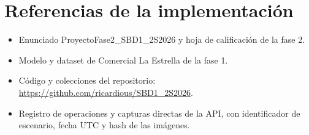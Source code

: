 \documentclass[10pt,letterpaper]{article}
\begin{document}
\section{Referencias de la implementación}

\begin{itemize}\item Enunciado ProyectoFase2\_SBD1\_2S2026 y hoja de calificación de la fase 2.\item Modelo y dataset de Comercial La Estrella de la fase 1.\item Código y colecciones del repositorio: \url{https://github.com/ricardious/SBD1_2S2026}.\item Registro de operaciones y capturas directas de la API, con identificador de escenario, fecha UTC y hash de las imágenes.\end{itemize}
\end{document}
